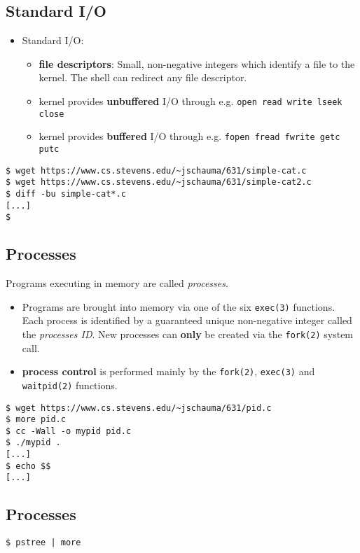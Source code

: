 \documentclass[sxga]{xdvislides}
\begin{document}
\subsection{Standard I/O}
\begin{itemize}
	\item	Standard I/O:
		\begin{itemize}
			\item {\bf file descriptors}: Small, non-negative
				integers which identify a file to the kernel.
				The shell can redirect any file descriptor.
			\item kernel provides {\bf unbuffered} I/O through e.g.
				{\tt open read write lseek close}
			\item kernel provides {\bf buffered} I/O through e.g.
				{\tt fopen fread fwrite getc putc}
		\end{itemize}
\end{itemize}
\vspace*{\fill}
\begin{verbatim}
$ wget https://www.cs.stevens.edu/~jschauma/631/simple-cat.c
$ wget https://www.cs.stevens.edu/~jschauma/631/simple-cat2.c
$ diff -bu simple-cat*.c
[...]
$
\end{verbatim}
\vspace*{\fill}


\subsection{Processes}
Programs executing in memory are called {\em processes}.
\begin{itemize}
	\item Programs are brought into memory via one of the
		six {\tt exec(3)} functions.  Each process is identified
		by a guaranteed unique non-negative integer called the
		{\em processes ID}. New processes can {\bf only} be
		created via the {\tt fork(2)} system call.
	\item {\bf process control} is performed mainly by the
		{\tt fork(2)}, {\tt exec(3)} and {\tt waitpid(2)} functions.
\end{itemize}
\vspace*{\fill}
\begin{verbatim}
$ wget https://www.cs.stevens.edu/~jschauma/631/pid.c
$ more pid.c
$ cc -Wall -o mypid pid.c
$ ./mypid .
[...]
$ echo $$
[...]
\end{verbatim}
\vspace*{\fill}

\subsection{Processes}
\vspace*{\fill}
\Huge
\begin{center}
	{\tt \$ pstree | more}
\end{center}
\Normalsize
\vspace*{\fill}
\end{document}
